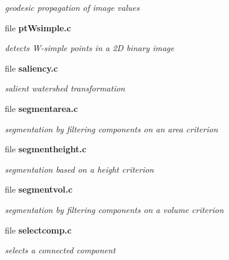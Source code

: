 \begin{DoxyCompactItemize}
\begin{DoxyCompactList}\small\item\em geodesic propagation of image values \item\end{DoxyCompactList}

\item 
file {\bf ptWsimple.c}


\begin{DoxyCompactList}\small\item\em detects W-\/simple points in a 2D binary image \item\end{DoxyCompactList}

\item 
file {\bf saliency.c}


\begin{DoxyCompactList}\small\item\em salient watershed transformation \item\end{DoxyCompactList}

\item 
file {\bf segmentarea.c}


\begin{DoxyCompactList}\small\item\em segmentation by filtering components on an area criterion \item\end{DoxyCompactList}

\item 
file {\bf segmentheight.c}


\begin{DoxyCompactList}\small\item\em segmentation based on a height criterion \item\end{DoxyCompactList}

\item 
file {\bf segmentvol.c}


\begin{DoxyCompactList}\small\item\em segmentation by filtering components on a volume criterion \item\end{DoxyCompactList}

\item 
file {\bf selectcomp.c}


\begin{DoxyCompactList}\small\item\em selects a connected component \item\end{DoxyCompactList}


\end{DoxyCompactItemize}
